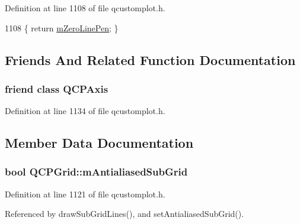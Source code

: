 Definition at line 1108 of file qcustomplot.\+h.


\begin{DoxyCode}
1108 \{ \textcolor{keywordflow}{return} \hyperlink{class_q_c_p_grid_a379481871f17655c27eda30af233554f}{mZeroLinePen}; \}
\end{DoxyCode}


\subsection{Friends And Related Function Documentation}
\hypertarget{class_q_c_p_grid_af123edeca169ec7a31958a1d714e1a8a}{}
\subsubsection[{Q\+C\+P\+Axis}]{\setlength{\rightskip}{0pt plus 5cm}friend class {\bf Q\+C\+P\+Axis}\hspace{0.3cm}{\ttfamily [friend]}}\label{class_q_c_p_grid_af123edeca169ec7a31958a1d714e1a8a}


Definition at line 1134 of file qcustomplot.\+h.



\subsection{Member Data Documentation}
\hypertarget{class_q_c_p_grid_a71b7051f833f0c5de3094998d6afdd87}{}
\subsubsection[{m\+Antialiased\+Sub\+Grid}]{\setlength{\rightskip}{0pt plus 5cm}bool Q\+C\+P\+Grid\+::m\+Antialiased\+Sub\+Grid\hspace{0.3cm}{\ttfamily [protected]}}\label{class_q_c_p_grid_a71b7051f833f0c5de3094998d6afdd87}


Definition at line 1121 of file qcustomplot.\+h.



Referenced by draw\+Sub\+Grid\+Lines(), and set\+Antialiased\+Sub\+Grid().

\hypertarget{class_q_c_p_grid_a8c0df56ae86440408c050895dcdb922b}{}
